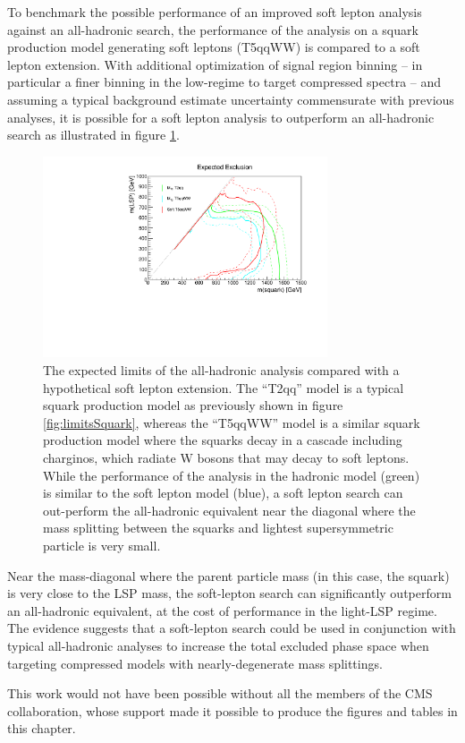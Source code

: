 To benchmark the possible performance of an improved soft lepton analysis against an all-hadronic search, the performance of the \mttwo analysis on a squark production model generating soft leptons (T5qqWW) is compared to a soft lepton extension. With additional optimization of signal region binning -- in particular a finer binning in the low-\MET regime to target compressed spectra -- and assuming a typical background estimate uncertainty commensurate with previous analyses, it is possible for a soft lepton analysis to outperform an all-hadronic search as illustrated in figure \ref{fig:softfuture}. 
\begin{figure}
	\centering
	\includegraphics[width=0.75\textwidth]{soft/figs/expectedSoftLimit.pdf}
	\caption{The expected limits of the all-hadronic \mttwo analysis compared with a hypothetical soft lepton extension. The ``T2qq'' model is a typical squark production model as previously shown in figure \ref{fig:limitsSquark}, whereas the ``T5qqWW'' model is a similar squark production model where the squarks decay in a cascade including charginos, which radiate W bosons that may decay to soft leptons. While the performance of the \mttwo analysis in the hadronic model (green) is similar to the soft lepton model (blue), a soft lepton search can out-perform the all-hadronic equivalent near the diagonal where the mass splitting between the squarks and lightest supersymmetric particle is very small.}
	\label{fig:softfuture}
\end{figure}

Near the mass-diagonal where the parent particle mass (in this case, the squark) is very close to the LSP mass, the soft-lepton search can significantly outperform an all-hadronic equivalent, at the cost of performance in the light-LSP regime. The evidence suggests that a soft-lepton search could be used in conjunction with typical all-hadronic analyses to increase the total excluded phase space when targeting compressed models with nearly-degenerate mass splittings.

This work would not have been possible without all the members of the CMS collaboration, whose support made it possible to produce the figures and tables in this chapter.

